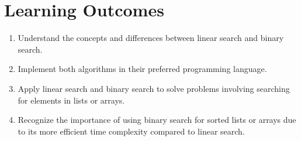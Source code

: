\documentclass[12pt]{fphw}
\begin{document}
\section{Learning Outcomes}
\begin{enumerate}
  \item Understand the concepts and differences between linear search and binary search.
  \item Implement both algorithms in their preferred programming language.
  \item Apply linear search and binary search to solve problems involving searching for elements in lists or arrays.
  \item Recognize the importance of using binary search for sorted lists or arrays due to its more efficient time complexity compared to linear search.
\end{enumerate}
\end{document}
